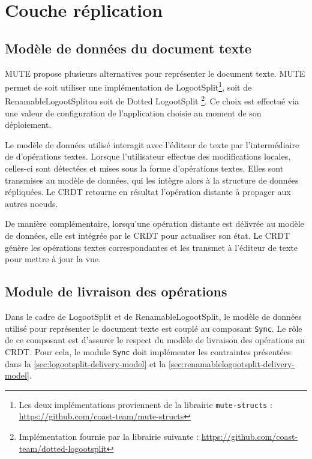 \documentclass[12pt]{thesul}
\begin{document}
\section{Couche réplication}

\subsection{Modèle de données du document texte}

MUTE propose plusieurs alternatives pour représenter le document texte.
MUTE permet de soit utiliser une implémentation de LogootSplit\footnote{Les deux implémentations proviennent de la librairie \texttt{mute-structs} : \url{https://github.com/coast-team/mute-structs}}, soit de RenamableLogootSplit\footnotemark[\value{footnote}] ou soit de Dotted LogootSplit \footnote{Implémentation fournie par la librairie suivante : \url{https://github.com/coast-team/dotted-logootsplit}}.
Ce choix est effectué via une valeur de configuration de l'application choisie au moment de son déploiement.

Le modèle de données utilisé interagit avec l'éditeur de texte par l'intermédiaire de d'opérations textes.
Lorsque l'utilisateur effectue des modifications locales, celles-ci sont détectées et mises sous la forme d'opérations textes.
Elles sont transmises au modèle de données, qui les intègre alors à la structure de données répliquées.
Le \ac{CRDT} retourne en résultat l'opération distante à propager aux autres noeuds.

De manière complémentaire, lorsqu'une opération distante est délivrée au modèle de données, elle est intégrée par le \ac{CRDT} pour actualiser son état.
Le \ac{CRDT} génère les opérations textes correspondantes et les transmet à l'éditeur de texte pour mettre à jour la vue.

\subsection{Module de livraison des opérations}

Dans le cadre de LogootSplit et de RenamableLogootSplit, le modèle de données utilisé pour représenter le document texte est couplé au composant \texttt{Sync}.
Le rôle de ce composant est d'assurer le respect du modèle de livraison des opérations au \ac{CRDT}.
Pour cela, le module \texttt{Sync} doit implémenter les contraintes présentées dans la \autoref{sec:logootsplit-delivery-model} et la \autoref{sec:renamablelogootsplit-delivery-model}.
\end{document}
